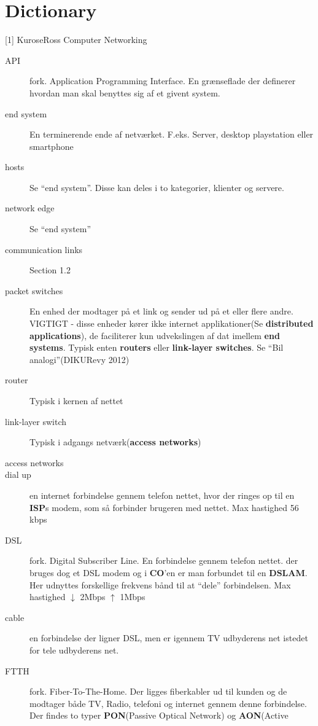 \documentclass[10pt]{article}
\begin{document}
\section{Dictionary}
[1] KuroseRoss Computer Networking

\begin{description}
\item[API] fork. Application Programming Interface. En grænseflade der
    definerer hvordan man skal benyttes sig af et givent system.
\item[end system] En terminerende ende af netværket. F.eks. Server, desktop
    playstation eller smartphone
\item[hosts] Se ``end system''. Disse kan deles i to kategorier, klienter og
    servere.
\item[network edge] Se ``end system''
\item[communication links] Section 1.2
\item[packet switches] En enhed der modtager på et link og sender ud på et
    eller flere andre. VIGTIGT - disse enheder kører ikke internet
    applikationer(Se \textbf{distributed applications}), de faciliterer kun
    udvekslingen af dat imellem \textbf{end systems}. Typisk enten 
    \textbf{routers} eller \textbf{link-layer switches}. 
    Se ``Bil analogi''(DIKURevy 2012)
\item[router] Typisk i kernen af nettet
\item[link-layer switch] Typisk i adgangs netværk(\textbf{access networks})
\item[access networks]
\item[dial up] en internet forbindelse gennem telefon nettet, hvor der ringes
    op til en \textbf{ISP}s modem, som så forbinder brugeren med nettet. Max
    hastighed 56 kbps
\item[DSL] fork. Digital Subscriber Line. En forbindelse gennem telefon nettet.
    der bruges dog et DSL modem og i \textbf{CO}'en er man forbundet til en 
    \textbf{DSLAM}. Her udnyttes forskellige frekvens bånd til at ``dele''
    forbindelsen. Max hastighed $\downarrow$ 2Mbps $\uparrow$ 1Mbps
\item[cable] en forbindelse der ligner DSL, men er igennem TV udbyderens net
    istedet for tele udbyderens net.
\item[FTTH] fork. Fiber-To-The-Home. Der ligges fiberkabler ud til kunden og de
    modtager både TV, Radio, telefoni og internet gennem denne forbindelse. Der
    findes to typer \textbf{PON}(Passive Optical Network) og \textbf{AON}(Active

\end{description}
\end{document}
